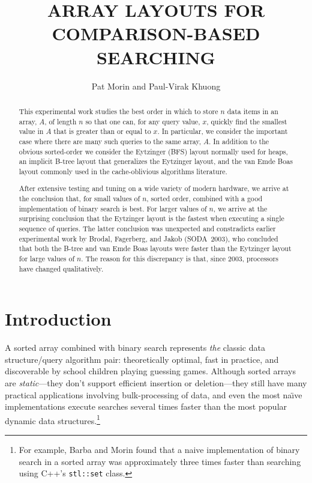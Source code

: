 \documentclass{patmorin}
\title{\MakeUppercase{Array Layouts for Comparison-Based Searching}}
\author{Pat Morin and Paul-Virak Khuong}
\begin{document}
\begin{titlepage}
\maketitle

\begin{abstract}
  This experimental work studies the best order in which to store $n$
  data items in an array, $A$, of length $n$ so that one can, for any
  query value, $x$, quickly find the smallest value in $A$ that is greater
  than or equal to $x$. In particular, we consider the important case
  where there are many such queries to the same array, $A$.  In addition
  to the obvious sorted-order we consider the Eytzinger (BFS) layout
  normally used for heaps, an implicit B-tree layout that generalizes
  the Eytzinger layout, and the van Emde Boas layout commonly used in
  the cache-oblivious algorithms literature.

  After extensive testing and tuning on a wide variety of modern hardware,
  we arrive at the conclusion that, for small values of $n$, sorted
  order, combined with a good implementation of binary search is best.
  For larger values of $n$, we arrive at the surprising conclusion that
  the Eytzinger layout is the fastest when executing a single sequence
  of queries.  The latter conclusion was unexpected and constradicts
  earlier experimental work by Brodal, Fagerberg, and Jakob (SODA~2003),
  who concluded that both the B-tree and van Emde Boas layouts were faster
  than the Eytzinger layout for large values of $n$.  The reason for this
  discrepancy is that, since 2003, processors have changed qualitatively.
\end{abstract}

\end{titlepage}

\section{Introduction}

A sorted array combined with binary search represents \emph{the} classic
data structure/query algorithm pair: theoretically optimal, fast in
practice, and discoverable by school children playing guessing games.
Although sorted arrays are \emph{static}---they don't support efficient
insertion or deletion---they still have many practical applications
involving bulk-processing of data, and even the most na\"{\i}ve
implementations execute searches several times faster than the most
popular dynamic data structures.\footnote{For example, Barba and Morin
\cite{bmXX} found that a naive implementation of binary search in a
sorted array was approximately three times faster than searching using
C++'s \texttt{stl::set} class.}
\end{document}
